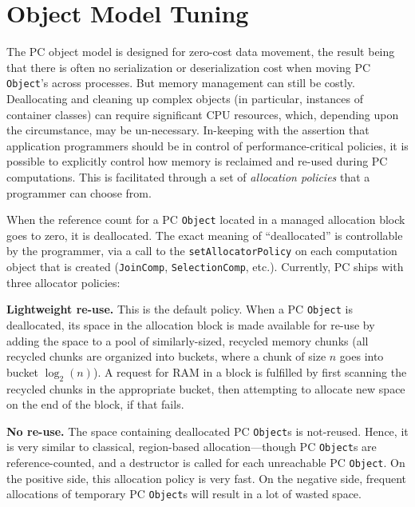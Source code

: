 \section{Object Model Tuning}

\noindent
The PC object model is designed for zero-cost data movement, the result being that there is often no serialization or deserialization
cost
when moving PC \texttt{Object}'s across processes.  But memory management can still be costly.  Deallocating and cleaning
up complex objects (in particular, instances of container classes) can require significant CPU resources, which, depending upon the 
circumstance, may be un-necessary.  In-keeping with the assertion that application programmers should be in
control of performance-critical policies, it is possible to explicitly control how memory is reclaimed and re-used during PC computations.
This is facilitated through a set of \emph{allocation policies} that a programmer can choose from.

When the reference count for a PC \texttt{Object} located in a managed allocation block goes to zero, it is deallocated.  The exact
meaning of ``deallocated'' is controllable by the programmer, via a call to the \texttt{setAllocatorPolicy} on each computation object
that is created (\texttt{JoinComp}, \texttt{SelectionComp}, etc.).  Currently, PC ships with
three allocator policies:

\vspace{5pt}

\textbf{Lightweight re-use.}  This is the default policy.  When a PC \texttt{Object} is deallocated, its space in the allocation block is made available for re-use by
adding the space to a pool of similarly-sized, recycled memory chunks (all recycled chunks are organized into buckets, where a chunk of size
$n$ goes into bucket $\log_2 (n)$).  A request for RAM in a block is fulfilled by first scanning the recycled chunks in the appropriate bucket, then
attempting to allocate new space on the end of the block, if that fails.

\textbf{No re-use.}  The space containing deallocated PC \texttt{Object}s is not-reused.  Hence, it is very similar to classical, region-based allocation---though PC \texttt{Object}s
are reference-counted, and a destructor is called for each unreachable PC \texttt{Object}.
On the positive side, this allocation policy is very fast.  On the negative side, frequent allocations of temporary PC \texttt{Object}s will result in a lot of wasted space.

